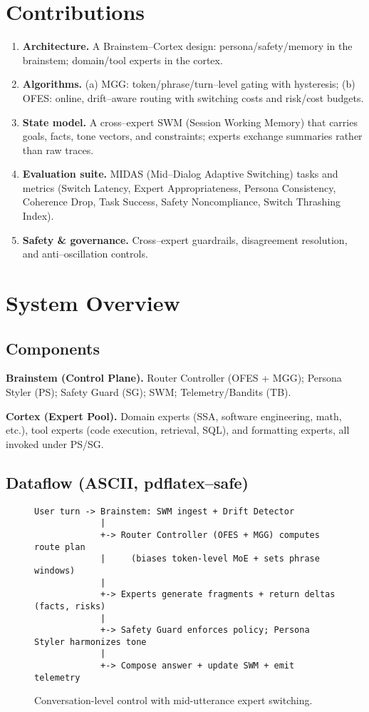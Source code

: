 \documentclass[11pt]{article}
\DeclareRobustCommand{\SWM}{\ifmmode\mathrm{SWM}\else\textsc{SWM}\fi}
\begin{document}
\section{Contributions}
\begin{enumerate}[leftmargin=*,itemsep=2pt,topsep=2pt]
\item \textbf{Architecture.} A Brainstem--Cortex design: persona/safety/memory in the brainstem; domain/tool experts in the cortex.
\item \textbf{Algorithms.} (a) MGG: token/phrase/turn--level gating with hysteresis; (b) OFES: online, drift--aware routing with switching costs and risk/cost budgets.
\item \textbf{State model.} A cross--expert \SWM{} (Session Working Memory) that carries goals, facts, tone vectors, and constraints; experts exchange summaries rather than raw traces.
\item \textbf{Evaluation suite.} MIDAS (Mid--Dialog Adaptive Switching) tasks and metrics (Switch Latency, Expert Appropriateness, Persona Consistency, Coherence Drop, Task Success, Safety Noncompliance, Switch Thrashing Index).
\item \textbf{Safety \& governance.} Cross--expert guardrails, disagreement resolution, and anti--oscillation controls.
\end{enumerate}

\section{System Overview}
\subsection{Components}
\textbf{Brainstem (Control Plane).} Router Controller (OFES + MGG); Persona Styler (PS); Safety Guard (SG); \SWM{}; Telemetry/Bandits (TB).

\textbf{Cortex (Expert Pool).} Domain experts (SSA, software engineering, math, etc.), tool experts (code execution, retrieval, SQL), and formatting experts, all invoked under PS/SG.

\subsection{Dataflow (ASCII, pdflatex--safe)}
\begin{figure}[h]
\centering
\begin{minipage}{0.95\linewidth}
\small
\begin{verbatim}
User turn -> Brainstem: SWM ingest + Drift Detector
             |
             +-> Router Controller (OFES + MGG) computes route plan
             |     (biases token-level MoE + sets phrase windows)
             |
             +-> Experts generate fragments + return deltas (facts, risks)
             |
             +-> Safety Guard enforces policy; Persona Styler harmonizes tone
             |
             +-> Compose answer + update SWM + emit telemetry
\end{verbatim}
\end{minipage}
\caption{Conversation-level control with mid-utterance expert switching.}
\end{figure}
\end{document}
